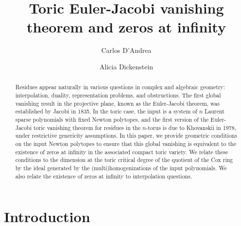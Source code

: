\documentclass[a4paper,11pt]{amsart}
\numberwithin{thm}{section}
\numberwithin{equation}{section}
\theoremstyle{definition}
\theoremstyle{plain}
\begin{document}
\title[Toric Euler-Jacobi theorem]{Toric Euler-Jacobi vanishing theorem and zeros at infinity }

\author{Carlos D'Andrea}
\address{Departament de Matem\`atiques i Inform\`atica, Universitat de Barcelona. Gran
Via 585, 08007 Barcelona, Spain \&  Centre de Recerca Matem\`atica, Edifici C, Campus Bellaterra, 08193 Bellaterra, Spain
}

\author{Alicia Dickenstein}
\address{Departamento de Matem\'atica, FCEN, Universidad de Buenos Aires, Ciudad Universitaria - Pab. I, (1428) Buenos Aires, Argentina}


\begin{abstract}

Residues appear naturally in various questions in complex and algebraic geometry: interpolation, duality, representation problems, and obstructions. 
The first global vanishing result in the projective plane, known as the Euler-Jacobi theorem, was established by Jacobi in 1835. 
In the toric case, the input is a system of $n$ Laurent sparse polynomials with fixed Newton polytopes, and the first version 
of the Euler-Jacobi toric vanishing theorem for residues in the $n$-torus is due to Khovanskii in 1978, under restrictive genericity
 assumptions. In  this paper, we provide geometric conditions on the input Newton polytopes to ensure that this global vanishing is 
 equivalent to the existence of zeros at infinity in the associated compact toric variety. We relate these conditions to the dimension 
 at the toric critical degree of the quotient of the Cox ring by the ideal generated by the (multi)homogenizations of the input polynomials. 
 We also relate the existence of zeros at infinity to interpolation questions.



\end{abstract}



\maketitle

\section{Introduction}\label{sec:intro}
\end{document}
